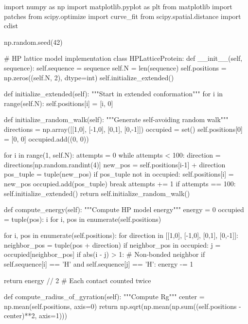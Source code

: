 \documentclass[a4paper, 11pt]{article}
\begin{document}
\begin{pycode}
import numpy as np
import matplotlib.pyplot as plt
from matplotlib import patches
from scipy.optimize import curve_fit
from scipy.spatial.distance import cdist

np.random.seed(42)

# HP lattice model implementation
class HPLatticeProtein:
    def __init__(self, sequence):
        self.sequence = sequence
        self.N = len(sequence)
        self.positions = np.zeros((self.N, 2), dtype=int)
        self.initialize_extended()

    def initialize_extended(self):
        """Start in extended conformation"""
        for i in range(self.N):
            self.positions[i] = [i, 0]

    def initialize_random_walk(self):
        """Generate self-avoiding random walk"""
        directions = np.array([[1,0], [-1,0], [0,1], [0,-1]])
        occupied = set()
        self.positions[0] = [0, 0]
        occupied.add((0, 0))

        for i in range(1, self.N):
            attempts = 0
            while attempts < 100:
                direction = directions[np.random.randint(4)]
                new_pos = self.positions[i-1] + direction
                pos_tuple = tuple(new_pos)
                if pos_tuple not in occupied:
                    self.positions[i] = new_pos
                    occupied.add(pos_tuple)
                    break
                attempts += 1
            if attempts == 100:
                self.initialize_extended()
                return self.initialize_random_walk()

    def compute_energy(self):
        """Compute HP model energy"""
        energy = 0
        occupied = {tuple(pos): i for i, pos in enumerate(self.positions)}

        for i, pos in enumerate(self.positions):
            for direction in [[1,0], [-1,0], [0,1], [0,-1]]:
                neighbor_pos = tuple(pos + direction)
                if neighbor_pos in occupied:
                    j = occupied[neighbor_pos]
                    if abs(i - j) > 1:  # Non-bonded neighbor
                        if self.sequence[i] == 'H' and self.sequence[j] == 'H':
                            energy -= 1

        return energy // 2  # Each contact counted twice

    def compute_radius_of_gyration(self):
        """Compute Rg"""
        center = np.mean(self.positions, axis=0)
        return np.sqrt(np.mean(np.sum((self.positions - center)**2, axis=1)))


\end{pycode}
\end{document}
